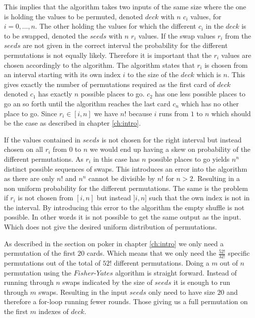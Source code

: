 This implies that the algorithm takes two inputs of the same size where the one is holding the values to be permuted, denoted $deck$ with $n$ $c_i$ values, for $i=0,\dots,n$. The other holding the values for which the different $c_i$ in the $deck$ is to be swapped, denoted the $seeds$ with $n$ $r_i$ values. If the swap values $r_i$ from the $seeds$ are not given in the correct interval the probability for the different permutations is not equally likely. Therefore it is important that the $r_i$ values are chosen accordingly to the algorithm. The algorithm states that $r_i$ is chosen from an interval starting with its own index $i$ to the size of the $deck$ which is $n$. This gives exactly the number of permutations required as the first card of $deck$ denoted $c_1$ has exactly $n$ possible places to go. $c_2$ has one less possible places to go an so forth until the algorithm reaches the last card $c_n$ which has no other place to go. Since $r_i\in[i,n]$ we have $n!$ because $i$ runs from $1$ to $n$ which should be the case as described in chapter \ref{ch:intro}.

If the values contained in $seeds$ is not chosen for the right interval but instead chosen on all $r_i$ from $0$ to $n$ we would end up having a skew on probability of the different permutations. As $r_i$ in this case has $n$ possible places to go yields $n^n$ distinct possible sequences of swaps. This introduces an error into the algorithm as there are only $n!$ and $n^n$ cannot be divisible by $n!$ for $n>2$. Resulting in a non uniform probability for the different permutations. The same is the problem if $r_i$ is not chosen from $[i,n]$ but instead $]i,n]$ such that the own index is not in the interval. By introducing this error to the algorithm the empty shuffle is not possible. In other words it is not possible to get the same output as the input. Which does not give the desired uniform distribution of permutations.

\bigskip

As described in the section on poker in chapter \ref{ch:intro} we only need a permutation of the first 20 cards. Which means that we only need the $\frac{52!}{32!}$ specific permutations out of the total of $52!$ different permutations. Doing a $m$ out of $n$ permutation using the $Fisher\text{-}Yates$ algorithm is straight forward. Instead of running through $n$ swaps indicated by the size of $seeds$ it is enough to run through $m$ swaps. Resulting in the input $seeds$ only need to have size $20$ and therefore a for-loop running fewer rounds. Those giving us a full permutation on the first $m$ indexes of $deck$.


